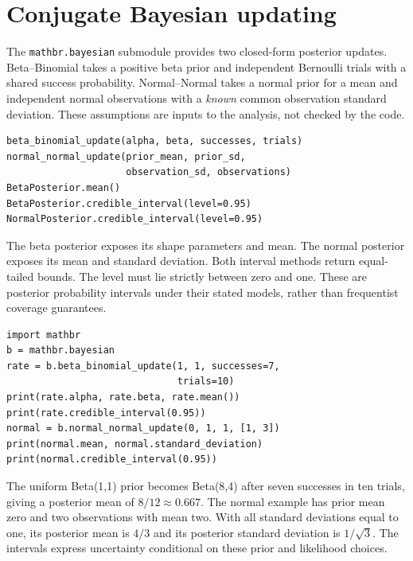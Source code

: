 \documentclass[11pt,a4paper]{article}
\begin{document}
\section{Conjugate Bayesian updating}
The \verb|mathbr.bayesian| submodule provides two closed-form posterior updates. Beta--Binomial takes a positive beta prior and independent Bernoulli trials with a shared success probability. Normal--Normal takes a normal prior for a mean and independent normal observations with a \emph{known} common observation standard deviation. These assumptions are inputs to the analysis, not checked by the code.
\begin{verbatim}
beta_binomial_update(alpha, beta, successes, trials)
normal_normal_update(prior_mean, prior_sd,
                     observation_sd, observations)
BetaPosterior.mean()
BetaPosterior.credible_interval(level=0.95)
NormalPosterior.credible_interval(level=0.95)
\end{verbatim}
The beta posterior exposes its shape parameters and mean. The normal posterior exposes its mean and standard deviation. Both interval methods return equal-tailed bounds. The level must lie strictly between zero and one. These are posterior probability intervals under their stated models, rather than frequentist coverage guarantees.
\begin{verbatim}
import mathbr
b = mathbr.bayesian
rate = b.beta_binomial_update(1, 1, successes=7,
                              trials=10)
print(rate.alpha, rate.beta, rate.mean())
print(rate.credible_interval(0.95))
normal = b.normal_normal_update(0, 1, 1, [1, 3])
print(normal.mean, normal.standard_deviation)
print(normal.credible_interval(0.95))
\end{verbatim}
The uniform Beta(1,1) prior becomes Beta(8,4) after seven successes in ten trials, giving a posterior mean of $8/12\approx0.667$. The normal example has prior mean zero and two observations with mean two. With all standard deviations equal to one, its posterior mean is $4/3$ and its posterior standard deviation is $1/\sqrt{3}$. The intervals express uncertainty conditional on these prior and likelihood choices.
\end{document}
